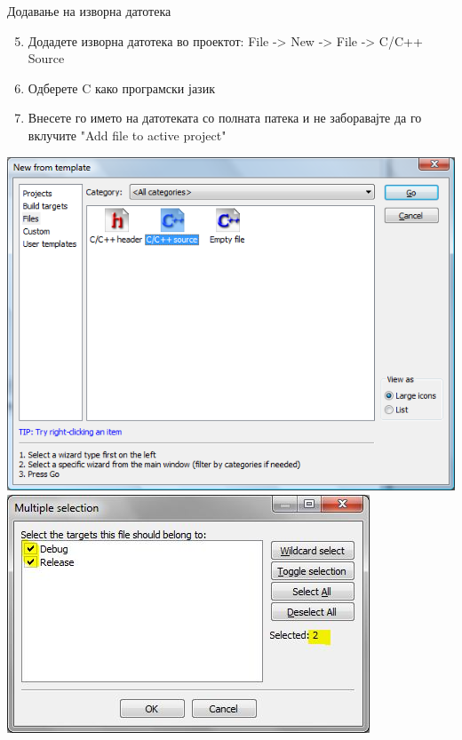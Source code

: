 \begin{frame}{Додавање на изворна датотека}
\begin{enumerate}
\setcounter{enumi}{4}
  \item Додадете изворна датотека во проектот: File -> New -> File -> C/C++
  Source
  \item Одберете C како програмски јазик 
  \item Внесете го името на датотеката со полната патека и не заборавајте да го
  вклучите  "Add file to active project" 
\end{enumerate}
\begin{center}
\includegraphics[scale=0.25]{images/cb_source}
\includegraphics[scale=0.4]{images/cb_include}
\end{center}
\end{frame}

